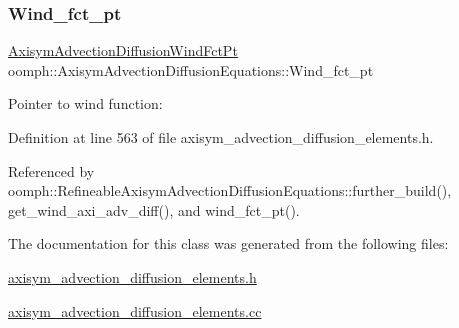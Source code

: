 \mbox{\label{classoomph_1_1AxisymAdvectionDiffusionEquations_a8249037271ae5094b9682ea42731068a}} 
\subsubsection{\texorpdfstring{Wind\+\_\+fct\+\_\+pt}{Wind\_fct\_pt}}
{\footnotesize\ttfamily \hyperlink{classoomph_1_1AxisymAdvectionDiffusionEquations_a53ee8d4a13b53896d66020591a8224b0}{Axisym\+Advection\+Diffusion\+Wind\+Fct\+Pt} oomph\+::\+Axisym\+Advection\+Diffusion\+Equations\+::\+Wind\+\_\+fct\+\_\+pt\hspace{0.3cm}{\ttfamily [protected]}}



Pointer to wind function\+: 



Definition at line 563 of file axisym\+\_\+advection\+\_\+diffusion\+\_\+elements.\+h.



Referenced by oomph\+::\+Refineable\+Axisym\+Advection\+Diffusion\+Equations\+::further\+\_\+build(), get\+\_\+wind\+\_\+axi\+\_\+adv\+\_\+diff(), and wind\+\_\+fct\+\_\+pt().



The documentation for this class was generated from the following files\+:\begin{DoxyCompactItemize}
\item 
\hyperlink{axisym__advection__diffusion__elements_8h}{axisym\+\_\+advection\+\_\+diffusion\+\_\+elements.\+h}\item 
\hyperlink{axisym__advection__diffusion__elements_8cc}{axisym\+\_\+advection\+\_\+diffusion\+\_\+elements.\+cc}\end{DoxyCompactItemize}
